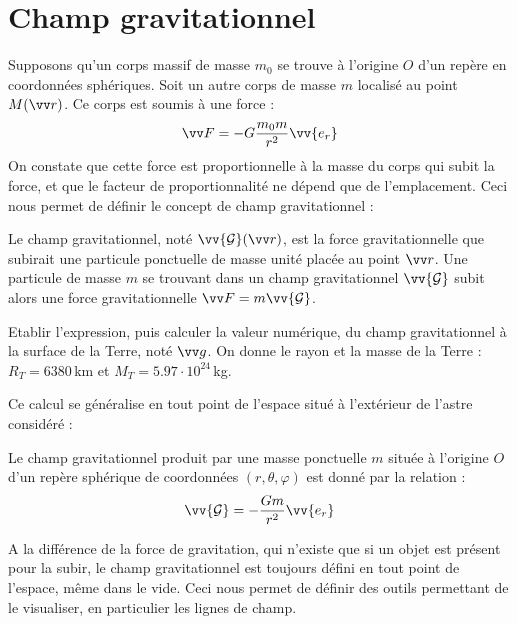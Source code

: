 \documentclass[11pt,fleqn]{book} %
\begin{document}
\section{Champ gravitationnel}

Supposons qu'un corps massif de masse $m_0$ se trouve à l'origine $O$ d'un repère en coordonnées sphériques. Soit un autre corps de masse $m$ localisé au point $M(\vv r)$. Ce corps est soumis à une force :
\begin{equation}
    \vv F = - G \frac{m_0 m}{r^2} \vv{e_r}
\end{equation}
On constate que cette force est proportionnelle à la masse du corps qui subit la force, et que le facteur de proportionnalité ne dépend que de l'emplacement. Ceci nous permet de définir le concept de champ gravitationnel :
\begin{definition}
    Le champ gravitationnel, noté $\vv{\mathcal{G}}(\vv r)$, est la force gravitationnelle que subirait une particule ponctuelle de masse unité placée au point $\vv r$.  Une particule de masse $m$ se trouvant dans un champ gravitationnel $\vv{\mathcal{G}}$ subit alors une force gravitationnelle $\vv F = m \vv{\mathcal{G}}$.
\end{definition}

\begin{capex}
	Etablir l'expression, puis calculer la valeur numérique, du champ gravitationnel à la surface de la Terre, noté $\vv g$. On donne le rayon et la masse de la Terre : $R_T = 6380$\,km et $M_T = 5.97 \cdot 10^{24}$\,kg.
\end{capex}

Ce calcul se généralise en tout point de l'espace situé à l'extérieur de l'astre considéré :
\begin{proposition}
    Le champ gravitationnel produit par une masse ponctuelle $m$ située à l'origine $O$ d'un repère sphérique de coordonnées $(r,\theta,\varphi)$ est donné par la relation :
    \begin{equation}
        \vv{\mathcal{G}} = - \frac{G m}{r^2} \vv{e_r}
    \end{equation}
\end{proposition}

A la différence de la force de gravitation, qui n'existe que si un objet est présent pour la subir, le champ gravitationnel est toujours défini en tout point de l'espace, même dans le vide. Ceci nous permet de définir des outils permettant de le visualiser, en particulier les lignes de champ.
\end{document}
